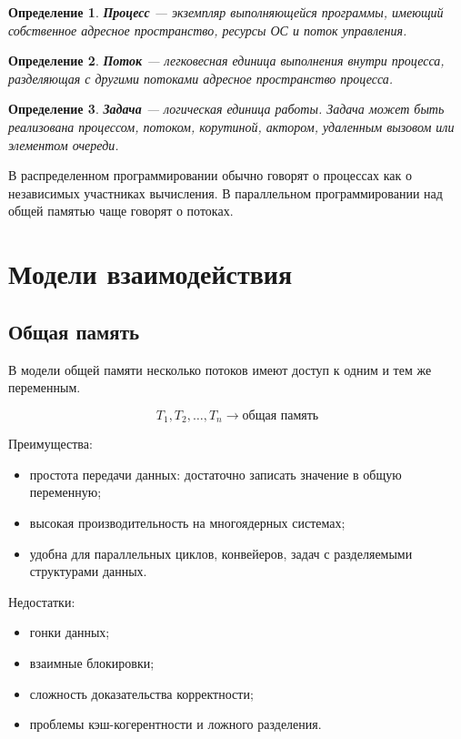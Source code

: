 \documentclass[12pt,a4paper]{article}
\newtheorem{definition}{Определение}
\begin{document}
\begin{definition}
\textbf{Процесс} --- экземпляр выполняющейся программы, имеющий собственное адресное пространство, ресурсы ОС и поток управления.
\end{definition}

\begin{definition}
\textbf{Поток} --- легковесная единица выполнения внутри процесса, разделяющая с другими потоками адресное пространство процесса.
\end{definition}

\begin{definition}
\textbf{Задача} --- логическая единица работы. Задача может быть реализована процессом, потоком, корутиной, актором, удаленным вызовом или элементом очереди.
\end{definition}

В распределенном программировании обычно говорят о процессах как о независимых участниках вычисления. В параллельном программировании над общей памятью чаще говорят о потоках.

\section{Модели взаимодействия}

\subsection{Общая память}

В модели общей памяти несколько потоков имеют доступ к одним и тем же переменным.

\[
T_1, T_2, \dots, T_n \longrightarrow \text{общая память}
\]

Преимущества:
\begin{itemize}
    \item простота передачи данных: достаточно записать значение в общую переменную;
    \item высокая производительность на многоядерных системах;
    \item удобна для параллельных циклов, конвейеров, задач с разделяемыми структурами данных.
\end{itemize}

Недостатки:
\begin{itemize}
    \item гонки данных;
    \item взаимные блокировки;
    \item сложность доказательства корректности;
    \item проблемы кэш-когерентности и ложного разделения.
\end{itemize}
\end{document}
